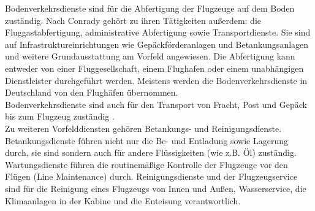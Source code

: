 Bodenverkehrsdienste sind für die Abfertigung der Flugzeuge auf dem Boden zuständig.
Nach Conrady \cite{conrady2019luftverkehr} gehört zu ihren Tätigkeiten außerdem:  
die Fluggastabfertigung, administrative Abfertigung sowie Transportdienste.
Sie sind auf Infrastruktureinrichtungen wie Gepäckförderanlagen und Betankungsanlagen 
und weitere Grundausstattung am Vorfeld angewiesen. 
Die Abfertigung kann entweder von einer Fluggesellschaft, einem Flughafen oder einem 
unabhängigen Dienstleister durchgeführt werden. 
Meistens werden die Bodenverkehrsdienste in Deutschland von den Flughäfen übernommen.\\ %
%
Bodenverkehrsdienste sind auch für den Transport von Fracht, Post und Gepäck 
bis zum Flugzeug zuständig \cite{mensen2013handbuch}.\\
Zu weiteren Vorfelddiensten gehören Betankungs- und Reinigungsdienste.
Betankungsdienste führen nicht nur die Be- und Entladung sowie Lagerung durch, 
sie sind sondern auch für andere Flüssigkeiten (wie z.B. Öl) zuständig.
Wartungsdienste führen die routinemäßige Kontrolle der Flugzeuge vor den Flügen (Line Maintenance) durch.
Reinigungsdienste und der Flugzeugservice sind für die Reinigung eines Flugzeugs 
von Innen und Außen, Wasserservice, die Klimaanlagen in der Kabine und die Enteisung verantwortlich.
%
%

